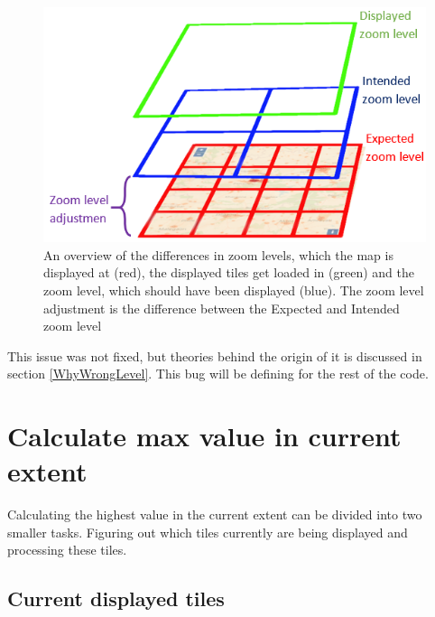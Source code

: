 \begin{figure} [H]
	\centering
	\includegraphics[width=.6\textwidth]{Pictures/DifferentZoom}
	\caption{An overview of the differences in zoom levels, which the map is displayed at (red), the displayed tiles get loaded in (green) and the zoom level, which should have been displayed (blue). The zoom level adjustment is the difference between the Expected and Intended zoom level}
	\label{DifferentZoom}
\end{figure}

This issue was not fixed, but theories behind the origin of it is discussed in section \ref{WhyWrongLevel}. 
This bug will be defining for the rest of the code.



\section{Calculate max value in current extent}\label{calculateCurrentValues}
Calculating the highest value in the current extent can be divided into two smaller tasks. Figuring out which tiles currently are being displayed and processing these tiles. 


\subsection{Current displayed tiles}\label{CurrentDisplayedTiles}

